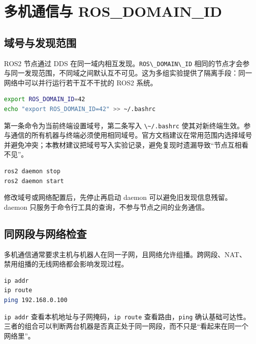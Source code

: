 \section{多机通信与
ROS\_DOMAIN\_ID}\label{ux591aux673aux901aux4fe1ux4e0e-ros_domain_id}

\subsection{域号与发现范围}\label{ux57dfux53f7ux4e0eux53d1ux73b0ux8303ux56f4}

ROS2 节点通过 DDS
在同一域内相互发现。\passthrough{\lstinline!ROS\_DOMAIN\_ID!}
相同的节点才会参与同一发现范围，不同域之间默认互不可见。这为多组实验提供了隔离手段：同一网络中可以并行运行若干互不干扰的
ROS2 系统。

\begin{lstlisting}[language=bash]
export ROS_DOMAIN_ID=42
echo "export ROS_DOMAIN_ID=42" >> ~/.bashrc
\end{lstlisting}

第一条命令为当前终端设置域号，第二条写入
\passthrough{\lstinline!\~/.bashrc!}
使其对新终端生效。参与通信的所有机器与终端必须使用相同域号。官方文档建议在常用范围内选择域号并避免冲突；本教材建议把域号写入实验记录，避免复现时遗漏导致``节点互相看不见''。

\begin{lstlisting}[language=bash]
ros2 daemon stop
ros2 daemon start
\end{lstlisting}

修改域号或网络配置后，先停止再启动 daemon 可以避免旧发现信息残留。daemon
只服务于命令行工具的查询，不参与节点之间的业务通信。

\subsection{同网段与网络检查}\label{ux540cux7f51ux6bb5ux4e0eux7f51ux7edcux68c0ux67e5}

多机通信通常要求主机与机器人在同一子网，且网络允许组播。跨网段、NAT、禁用组播的无线网络都会影响发现过程。

\begin{lstlisting}[language=bash]
ip addr
ip route
ping 192.168.0.100
\end{lstlisting}

\passthrough{\lstinline!ip addr!}
查看本机地址与子网掩码，\passthrough{\lstinline!ip route!}
查看路由，\passthrough{\lstinline!ping!}
确认基础可达性。三者的组合可以判断两台机器是否真正处于同一网段，而不只是``看起来在同一个网络里''。

